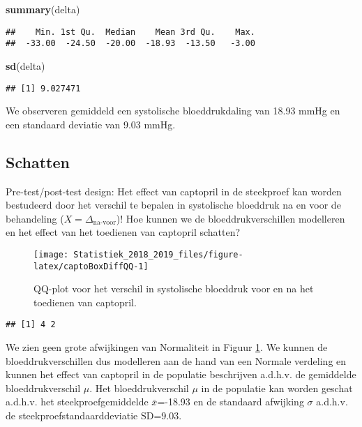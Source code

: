 \documentclass[12pt,dutch,coursenotes]{book}
\newenvironment{Shaded}{\begin{snugshade}}{\end{snugshade}}
\newcommand{\KeywordTok}[1]{\textcolor[rgb]{0.13,0.29,0.53}{\textbf{#1}}}
\newcommand{\NormalTok}[1]{#1}
\theoremstyle{definition}
\theoremstyle{definition}
\theoremstyle{definition}
\theoremstyle{remark}
\begin{document}
\begin{Shaded}
\begin{Highlighting}[]
\KeywordTok{summary}\NormalTok{(delta)}
\end{Highlighting}
\end{Shaded}

\begin{verbatim}
##    Min. 1st Qu.  Median    Mean 3rd Qu.    Max. 
##  -33.00  -24.50  -20.00  -18.93  -13.50   -3.00
\end{verbatim}

\begin{Shaded}
\begin{Highlighting}[]
\KeywordTok{sd}\NormalTok{(delta)}
\end{Highlighting}
\end{Shaded}

\begin{verbatim}
## [1] 9.027471
\end{verbatim}

We observeren gemiddeld een systolische bloeddrukdaling van 18.93 mmHg
en een standaard deviatie van 9.03 mmHg.

\subsection{Schatten}\label{schatten}

Pre-test/post-test design: Het effect van captopril in de steekproef kan
worden bestudeerd door het verschil te bepalen in systolische bloeddruk
na en voor de behandeling (\(X=\Delta_\text{na-voor}\))! Hoe kunnen we
de bloeddrukverschillen modelleren en het effect van het toedienen van
captopril schatten?

\begin{figure}

{\centering \texttt{[image: Statistiek\_2018\_2019\_files/figure-latex/captoBoxDiffQQ-1]} 

}

\caption{QQ-plot voor het verschil in systolische bloeddruk voor en na het toedienen van captopril.}\label{fig:captoBoxDiffQQ}
\end{figure}

\begin{verbatim}
## [1] 4 2
\end{verbatim}

We zien geen grote afwijkingen van Normaliteit in Figuur
\ref{fig:captoBoxDiffQQ}. We kunnen de bloeddrukverschillen dus
modelleren aan de hand van een Normale verdeling en kunnen het effect
van captopril in de populatie beschrijven a.d.h.v. de gemiddelde
bloeddrukverschil \(\mu\). Het bloeddrukverschil \(\mu\) in de populatie
kan worden geschat a.d.h.v. het steekproefgemiddelde \(\bar x\)=-18.93
en de standaard afwijking \(\sigma\) a.d.h.v. de
steekproefstandaarddeviatie \(\text{SD}\)=9.03.
\end{document}
